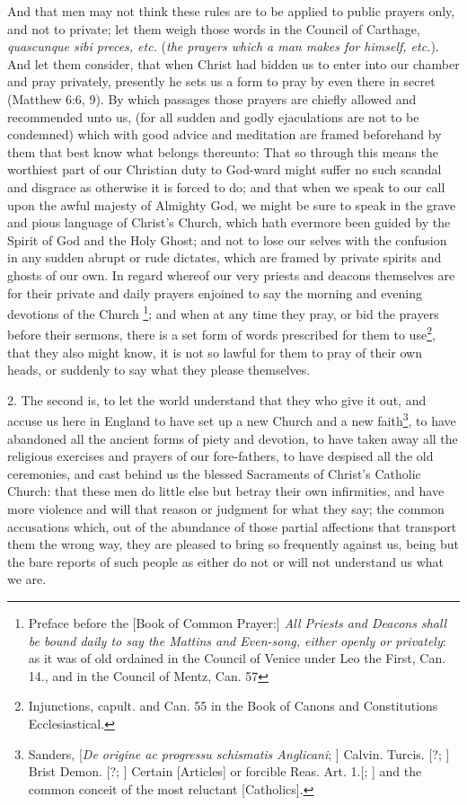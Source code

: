\documentclass{article}
\begin{document}
And that men may not think these rules are to be applied to public prayers only,
and not to private; let them weigh those words in the Council of Carthage,
\textit{quascunque sibi preces, etc.} (\textit{the prayers which a
    man makes for himself,
etc.}). And let them consider, that when Christ had bidden us to
enter into our chamber and pray
privately, presently he sets us a form to pray by even there in
secret (Matthew 6:6, 9).
By which passages those prayers are chiefly allowed and recommended
unto us, (for all
sudden and godly ejaculations are not to be condemned) which with good
advice and meditation are framed
beforehand by them that best know what belongs thereunto: That so
through this means the worthiest
part of our Christian duty to God-ward might suffer no such scandal
and disgrace as otherwise
it is forced to do; and that when we speak to our call upon the awful
majesty of Almighty God,
we might be sure to speak in the grave and pious language of Christ's
Church, which
hath evermore been guided by the Spirit of God and the Holy Ghost;
and not to lose our
selves with the confusion in any sudden abrupt or rude dictates,
which are framed
by private spirits and ghosts of our own. In regard whereof our very
priests and deacons
themselves are for their private and daily prayers enjoined to say the
morning and evening devotions of the Church \footnote{Preface before
  the [Book of Common Prayer:] \textit{All Priests and Deacons shall be
    bound daily to say the Mattins and Even-song, either openly or
  privately}: as it was of old ordained in the Council of Venice under
Leo the First, Can. 14., and in the Council of Mentz, Can. 57}; and when
at any time they pray, or bid the prayers before their sermons, there
is a set form of words
prescribed for them to use\footnote{Injunctions, capult. and Can. 55
in the Book of Canons and Constitutions Ecclesiastical.},
that they also might know, it is not so lawful for them to pray of
their own heads, or suddenly to say
what they please themselves.

2. The second is, to let the world understand that they who give it out, and
accuse us here in England to have set up a new Church and a new
faith\footnote{Sanders,
  [\textit{De origine ac progressu schismatis Anglicani}; ] Calvin.
  Turcis. [?; ]
  Brist Demon. [?; ] Certain [Articles] or forcible Reas. Art. 1.[; ]
  and the common
conceit of the most reluctant [Catholics].}, to have abandoned all the ancient
forms of piety and devotion, to have taken away all the religious exercises and
prayers of our fore-fathers, to have despised all the old ceremonies,
and cast behind us the blessed Sacraments of Christ's Catholic Church:
that these men do little else but betray their own infirmities, and
have more violence
and will that reason or judgment for what they say; the common accusations
which, out of the abundance of those partial affections that
transport them the wrong way,
they are pleased to bring so frequently against us, being but the
bare reports of
such people as either do not or will not understand us what we are.
\end{document}
